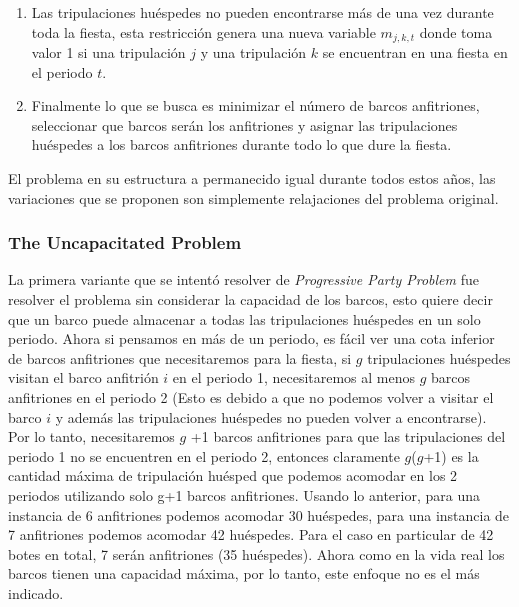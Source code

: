 \documentclass[spanish, fleqn]{article}
\begin{document}
\begin{enumerate}
\item Las tripulaciones huéspedes no pueden encontrarse más de una vez durante toda la fiesta, esta restricción genera una nueva variable $\mathit{m}_{\mathit{j},\mathit{k},\mathit{t}}$ donde toma valor 1 si una tripulación $\mathit{j}$ y una tripulación $\mathit{k}$ se encuentran en una fiesta en el periodo $\mathit{t}$.

\item Finalmente lo que se busca es minimizar el número de barcos anfitriones, seleccionar que barcos serán los anfitriones y asignar las tripulaciones huéspedes a los barcos anfitriones durante todo lo que dure la fiesta.

\end{enumerate}

El problema en su estructura a permanecido igual durante todos estos años, las variaciones que se proponen son simplemente relajaciones del problema original.


\subsubsection*{The Uncapacitated Problem~\cite{Smith1996}}

La primera variante que se intentó resolver de \textit{Progressive Party Problem} fue resolver el problema sin considerar la capacidad de los barcos, esto quiere decir que un barco puede almacenar a todas las tripulaciones huéspedes en un solo periodo. Ahora si pensamos en más de un periodo, es fácil ver una cota inferior de barcos anfitriones que necesitaremos para la fiesta, si $\mathit{g}$ tripulaciones huéspedes visitan el barco anfitrión $\mathit{i}$ en el periodo 1, necesitaremos al menos $\mathit{g}$ barcos anfitriones en el periodo 2 (Esto es debido a que no podemos volver a visitar el barco $\mathit{i}$ y además las tripulaciones huéspedes no pueden volver a encontrarse). Por lo tanto, necesitaremos $\mathit{g}$ +1 barcos anfitriones para que las tripulaciones del periodo 1 no se encuentren en el periodo 2, entonces claramente $\mathit{g}$($\mathit{g}$+1) es la cantidad máxima de tripulación huésped que podemos acomodar en los 2 periodos utilizando solo g+1 barcos anfitriones. Usando lo anterior, para una instancia de 6 anfitriones podemos acomodar 30 huéspedes, para una instancia de 7 anfitriones podemos acomodar 42 huéspedes. Para el caso en particular de 42 botes en total, 7 serán anfitriones (35 huéspedes). Ahora como en la vida real los barcos tienen una capacidad máxima, por lo tanto, este enfoque no es el más indicado.
\end{document}
